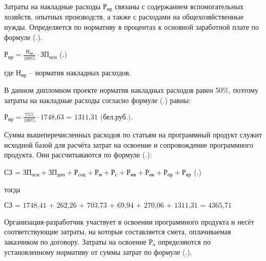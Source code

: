 {	\par \redline Затраты на накладные расходы $\textrm{Р}_{\textrm{нр}}$ связаны с содержанием вспомогательных хозяйств, опытных производств, а также с расходами на общехозяйственные нужды. Определяется по нормативу в процентах к основной заработной плате по формуле (\thechaptercntr .\theformulacntr).

	\formulaspace \par \redline 
		$\textrm{Р}_{\textrm{нр}} = \frac{\textrm{Н}_{\textrm{нр}}}{\textrm{100\%}} \cdot \textrm{ЗП}_{\textrm{осн}}$
	\hfill (\thechaptercntr .\theformulacntr) \redline
	\formulaspace 

	\par \redline где $\textrm{Н}_{\textrm{нр}}$ {--} норматив накладных расходов.
	
	\par \redline В данном дипломном проекте норматив накладных расходов равен 50\%, поэтому затраты на накладные расходы согласно формуле (\thechaptercntr .\theformulacntr) равны: \addtocounter{formulacntr}{1}

	\formulaspace \par \redline 
		$\textrm{Р}_{\textrm{нр}} = \frac{\textrm{75\%}}{\textrm{100\%}} \cdot \textrm{1748,63 = 1311,31 (бел.руб.).}$
	\formulaspace

	\par \redline Сумма вышеперечисленных расходов по статьям на программный продукт служит исходной базой для расчёта затрат на освоение и сопровождение программного продукта. Они рассчитываются по формуле (\thechaptercntr .\theformulacntr):

	\formulaspace \par \redline 
		$\textrm{СЗ = } \textrm{ЗП}_{\textrm{осн}} + \textrm{ЗП}_{\textrm{доп}} + \textrm{Р}_{\textrm{соц}} + \textrm{Р}_{\textrm{м}} + \textrm{Р}_{\textrm{с}} + \textrm{Р}_{\textrm{мв}} + \textrm{Р}_{\textrm{нк}} + \textrm{Р}_{\textrm{пр}} + \textrm{Р}_{\textrm{нр}}$
	\hfill (\thechaptercntr .\theformulacntr) \redline
	\formulaspace \addtocounter{formulacntr}{1}

	\par \redline тогда

	\formulaspace \par \redline 
		$\textrm{СЗ = 1748,41 + 262,26 + 703,73 + 69,94 + 270,06 + 1311,31 = 4365,71 (бел.руб.).}$
	\formulaspace 

	\par \redline Организация-разработчик участвует в освоении программного продукта и несёт соответствующие затраты, на которые составляется смета, оплачиваемая заказчиком по договору. Затраты на освоение $\textrm{Р}_{\textrm{о}}$ определяются по установленному нормативу от суммы затрат по формуле (\thechaptercntr .\theformulacntr).

}
